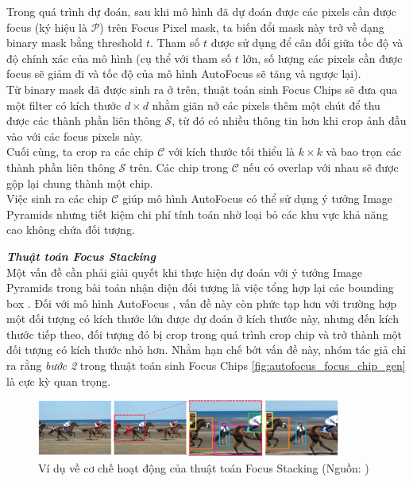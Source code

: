 {    \noindent
    Trong quá trình dự đoán, sau khi mô hình đã dự đoán được các pixels  cần được focus (ký hiệu là $\mathcal{P}$) trên Focus Pixel  mask, ta biến đổi mask này trở về dạng binary mask bằng threshold $t$.
    Tham số $t$ được sử dụng để cân đối giữa tốc độ và độ chính xác của mô hình (cụ thể với tham số $t$ lớn, số lượng các pixels  cần được focus sẽ giảm đi và tốc độ của mô hình AutoFocus  sẽ tăng và ngược lại). \\
    Từ binary mask đã được sinh ra ở trên, thuật toán sinh Focus Chips sẽ đưa qua một filter có kích thước $d \times d$ nhằm giãn nở các pixels  thêm một chút để thu được các thành phần liên thông $\mathcal{S}$, từ đó có nhiều thông tin hơn khi crop ảnh đầu vào với các focus pixels  này. \\
    Cuối cùng, ta crop ra các chip $\mathcal{C}$ với kích thước tối thiểu là $k \times k$ và bao trọn các thành phần liên thông $\mathcal{S}$ trên.
    Các chip trong $\mathcal{C}$ nếu có overlap với nhau sẽ được gộp lại chung thành một chip. \\
    Việc sinh ra các chip $\mathcal{C}$ giúp mô hình AutoFocus  có thể sử dụng ý tưởng Image Pyramids nhưng tiết kiệm chi phí tính toán nhờ loại bỏ các khu vực khả năng cao không chứa đối tượng.

    \noindent
    \textbf{\textit{Thuật toán Focus Stacking}} \\
    Một vấn đề cần phải giải quyết khi thực hiện dự đoán với ý tưởng Image Pyramids trong bài toán nhận diện đối tượng  là việc tổng hợp lại các bounding box .
    Đối với mô hình AutoFocus , vấn đề này còn phức tạp hơn với trường hợp một đối tượng có kích thước lớn được dự đoán ở kích thước này, nhưng đến kích thước tiếp theo, đối tượng đó bị crop trong quá trình crop chip và trở thành một đối tượng có kích thước nhỏ hơn.
    Nhằm hạn chế bớt vấn đề này, nhóm tác giả chỉ ra rằng \textit{bước 2} trong thuật toán sinh Focus Chips \ref{fig:autofocus_focus_chip_gen} là cực kỳ quan trọng.

    \begin{figure}[H]
        \centering
        \includegraphics[width=10cm] {images/autofocus_focus_stack}
        \caption{Ví dụ về cơ chế hoạt động của thuật toán Focus Stacking (Nguồn: \cite{najibi2019autofocus})}
        \label{fig:autofocus_focus_stack}
    \end{figure}

}

